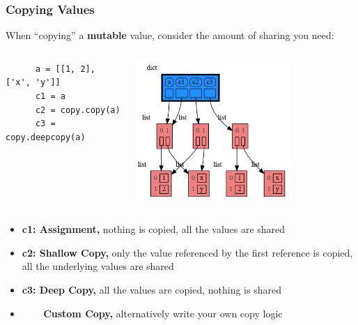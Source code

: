 \documentclass[10pt, colorlinks=true, urlcolor=blue]{beamer}
\begin{document}
\begin{frame}[fragile]
  \frametitle{Copying Values}
  When ``copying'' a \textbf{mutable} value, consider the amount of sharing you need:
  \vspace{-1em}
\begin{columns}
  \begin{verbatim}
      a = [[1, 2], ['x', 'y']]
      c1 = a
      c2 = copy.copy(a)
      c3 = copy.deepcopy(a)
    \end{verbatim}
    \begin{center}\includegraphics[width=0.7\textwidth]{figures/copy.png}\end{center}
\end{columns}
    \begin{itemize}
        \item \textbf{c1: Assignment,} nothing is copied, all the values are shared
        \item \textbf{c2: Shallow Copy,} only the value referenced by the first reference is copied, all the underlying values are shared
        \item \textbf{c3: Deep Copy,} all the values are copied, nothing is shared
        \item \ \ \, \,\, \textbf{Custom Copy,} alternatively write your own copy logic
    \end{itemize}
\end{frame}
\end{document}
